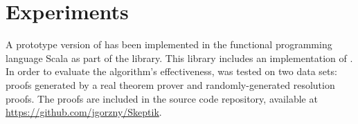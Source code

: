 \section{Experiments} \label{sec:exp}

A prototype version of {\FORPI} has been implemented in the functional programming language Scala as part of the \skeptik
library. This library includes an implementation of {\GFOLU} \cite{GFOLU}. In order to evaluate the algorithm's effectiveness, {\FORPI} was tested on two data sets: proofs generated by a real theorem prover and randomly-generated resolution proofs. The proofs are included in the source code repository, available at \url{https://github.com/jgorzny/Skeptik}.


